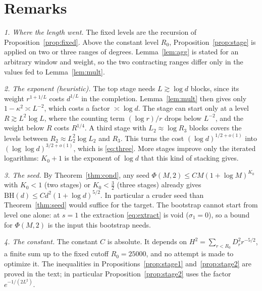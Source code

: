 \documentclass[11pt]{amsart}
\theoremstyle{definition}
\newcommand{\BH}{\mathrm{BH}}
\begin{document}
\section{Remarks}\label{sec:remarks}

\noindent\emph{1. Where the length went.} The fixed levels are the recursion of Proposition~\ref{prop:fixed}. Above the constant level $R_0$, Proposition~\ref{prop:stage} is applied on two or three ranges of degrees. Lemma~\ref{lem:agg} is stated for an arbitrary window and weight, so the two contracting ranges differ only in the values fed to Lemma~\ref{lem:mult}.

\smallskip\noindent\emph{2. The exponent (heuristic).} The top stage needs $L\gtrsim\log d$ blocks, since its weight $r^{1+1/L}$ costs $d^{1/L}$ in the completion. Lemma~\ref{lem:mult} then gives only $1-\kappa^2\asymp L^{-2}$, which costs a factor $\asymp\log d$. The stage can start only at a level $R\gtrsim L^2\log L$, where the counting term $(\log r)/r$ drops below $L^{-2}$, and the weight below $R$ costs $R^{1/4}$. A third stage with $L_2\approx\log R_3$ blocks covers the levels between $R_2\approx L_2^2\log L_2$ and $R_3$. This turns the cost $(\log d)^{1/2+o(1)}$ into $(\log\log d)^{3/2+o(1)}$, which is \eqref{eq:three}. More stages improve only the iterated logarithms: $K_0+1$ is the exponent of $\log d$ that this kind of stacking gives.

\smallskip\noindent\emph{3. The seed.} By Theorem~\ref{thm:cond}, any seed $\Phi(M,2)\le CM(1+\log M)^{K_0}$ with $K_0<1$ (two stages) or $K_0<\frac32$ (three stages) already gives $\BH(d)\le Cd^2(1+\log d)^{5/2}$. In particular a cruder seed than Theorem~\ref{thm:seed} would suffice for the target. The bootstrap cannot start from level one alone: at $s=1$ the extraction \eqref{eq:extract} is void ($\sigma_1=0$), so a bound for $\Phi(M,2)$ is the input this bootstrap needs.

\smallskip\noindent\emph{4. The constant.} The constant $C$ is absolute. It depends on $H^2=\sum_{r<R_0}D_r^2r^{-5/2}$, a finite sum up to the fixed cutoff $R_0=25000$, and no attempt is made to optimize it. The inequalities in Propositions~\ref{prop:stage1} and~\ref{prop:stage2} are proved in the text; in particular Proposition~\ref{prop:stage2} uses the factor $e^{-1/(2L^2)}$.
\end{document}
